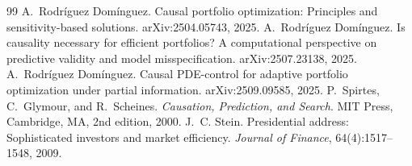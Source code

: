 \documentclass[11pt]{article}
\theoremstyle{plain}
\theoremstyle{definition}
\begin{document}
\begin{thebibliography}{99}
 A.~Rodr\'iguez Dom\'inguez. Causal portfolio optimization: Principles and sensitivity-based solutions. arXiv:2504.05743, 2025.
 A.~Rodr\'iguez Dom\'inguez. Is causality necessary for efficient portfolios? A computational perspective on predictive validity and model misspecification. arXiv:2507.23138, 2025.
 A.~Rodr\'iguez Dom\'inguez. Causal PDE-control for adaptive portfolio optimization under partial information. arXiv:2509.09585, 2025.
 P.~Spirtes, C.~Glymour, and R.~Scheines. \emph{Causation, Prediction, and Search}. MIT Press, Cambridge, MA, 2nd edition, 2000.
 J.~C. Stein. Presidential address: Sophisticated investors and market efficiency. \emph{Journal of Finance}, 64(4):1517--1548, 2009.
\end{thebibliography}
\end{document}
